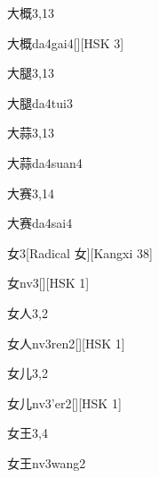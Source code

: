 \begin{entry}{大概}{3,13}
  \begin{phonetics}{大概}{da4gai4}[][HSK 3]
  \end{phonetics}
\end{entry}

\begin{entry}{大腿}{3,13}
  \begin{phonetics}{大腿}{da4tui3}
  \end{phonetics}
\end{entry}

\begin{entry}{大蒜}{3,13}
  \begin{phonetics}{大蒜}{da4suan4}
  \end{phonetics}
\end{entry}

\begin{entry}{大赛}{3,14}
  \begin{phonetics}{大赛}{da4sai4}
  \end{phonetics}
\end{entry}

\begin{entry}{女}{3}[Radical 女][Kangxi 38]
  \begin{phonetics}{女}{nv3}[][HSK 1]
  \end{phonetics}
\end{entry}

\begin{entry}{女人}{3,2}
  \begin{phonetics}{女人}{nv3ren2}[][HSK 1]
  \end{phonetics}
\end{entry}

\begin{entry}{女儿}{3,2}
  \begin{phonetics}{女儿}{nv3'er2}[][HSK 1]
  \end{phonetics}
\end{entry}

\begin{entry}{女王}{3,4}
  \begin{phonetics}{女王}{nv3wang2}
  \end{phonetics}
\end{entry}

